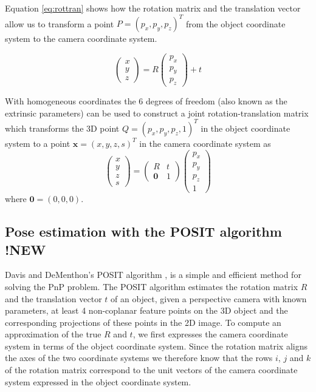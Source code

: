 \documentclass[11pt,a4paper]{report}
\begin{document}
Equation \ref{eq:rottran} shows how the rotation matrix and the translation vector allow us to transform a point $P
= (p_x,p_y,p_z)^T$
from the object coordinate system to the camera coordinate system. 

\begin{equation}\label{eq:rottran}
\begin{pmatrix}x\\y\\z\end{pmatrix} =
  R\begin{pmatrix}p_x\\p_y\\p_z\end{pmatrix} + t
\end{equation}

With homogeneous coordinates the 6 degrees of freedom (also known as the
extrinsic parameters) can be used to
construct a joint rotation-translation matrix which transforms the 3D point
$Q = (p_x,p_y,p_z,1)^T$ in the object coordinate system to a point $\mathbf{x}
= (x,y,z,s)^T$ in the camera coordinate system as
\begin{equation}\label{eq:jointrottran}
\begin{pmatrix}x\\y\\z\\s\end{pmatrix} =
  \begin{pmatrix}R&t\\\mathbf{0}&1\end{pmatrix}\begin{pmatrix}p_x\\p_y\\p_z\\1\end{pmatrix}
\end{equation}
where $\mathbf{0} = (0,0,0)$. 


\subsection{Pose estimation with the POSIT algorithm !NEW}\label{posit}
Davis and DeMenthon's POSIT algorithm \cite{POSIT}, \cite{opencv} is a simple and efficient method for solving the PnP
problem. The POSIT algorithm estimates the rotation matrix $R$ and the
translation vector $t$
of an object, given a perspective camera with known parameters, at least 4 non-coplanar feature points on the 3D object and the corresponding
projections of these points in the 2D image. To compute an approximation of the
true $R$ and $t$, we first expresses the camera coordinate system in terms of
the object coordinate system. Since the rotation matrix aligns the axes of the
two coordinate systems we therefore know that the rows $i$, $j$ and $k$ of the
rotation matrix correspond to the unit vectors of the camera coordinate
system expressed in the object coordinate system. 
\end{document}
